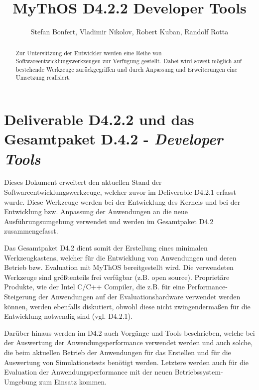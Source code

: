 

\title{MyThOS D4.2.2 Developer Tools}
\author{Stefan Bonfert, Vladimir Nikolov, Robert Kuban, Randolf Rotta}



\maketitle

\begin{abstract}

Zur Untersützung der Entwickler werden eine Reihe von
Softwareentwicklungswerkzeugen zur Verfügung gestellt. Dabei wird soweit möglich
auf bestehende Werkzeuge zurückgegriffen und durch Anpassung und Erweiterungen
eine Umsetzung realisiert.

\end{abstract}

\newpage
\tableofcontents
\newpage

\section{Deliverable D4.2.2 und das Gesamtpaket D.4.2 - \emph{Developer Tools}}

Dieses Dokument erweitert den aktuellen Stand der Softwareentwicklungswerkzeuge,
welcher zuvor im Deliverable D4.2.1 erfasst wurde.
Diese Werkzeuge werden bei der Entwicklung des Kernels und bei der Entwicklung
bzw. Anpassung der Anwendungen an die neue Ausführungsumgebung verwendet und
werden im Gesamtpaket D4.2 zusammengefasst.

Das Gesamtpaket D4.2 dient somit der Erstellung eines minimalen Werkzeugkastens,
welcher für die Entwicklung von Anwendungen und deren Betrieb bzw. Evaluation
mit MyThOS bereitgestellt wird. Die verwendeten Werkzeuge sind größtenteils frei
verfügbar (z.B. open source). Proprietäre Produkte, wie der Intel C/C++
Compiler, die z.B. für eine Performance-Steigerung der Anwendungen auf der
Evaluationshardware verwendet werden können, werden ebenfalls diskutiert, obwohl
diese nicht zwingendermaßen für die Entwicklung notwendig sind (vgl. D4.2.1).

Darüber hinaus werden im D4.2 auch Vorgänge und Tools beschrieben, welche bei
der Auswertung der Anwendungsperformance verwendet werden und auch solche, die
beim aktuellen Betrieb der Anwendungen für das Erstellen und für die Auswertung
von Simulationstests benötigt werden. Letztere werden auch für die Evaluation
der Anwendungsperformance mit der neuen Betriebssystem-Umgebung zum Einsatz
kommen. 

